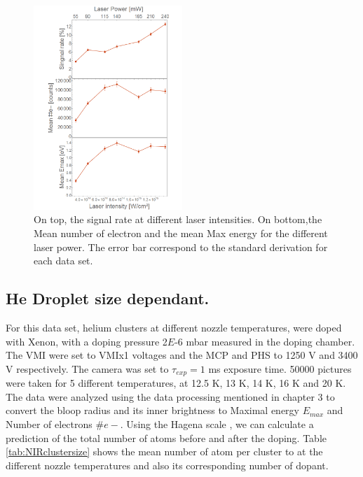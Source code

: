  \begin{figure}[h!]
\centering
\includegraphics[width=0.5\textwidth]{../Images/results/NIR_He_intensityscan/Alltogether.png} 
\caption[NIR He intensity dependence. Signal Rate and Mean Values)]{On top, the signal rate at different laser intensities. On bottom,the Mean number of electron and the mean Max energy for the different laser power. The error bar correspond to the standard derivation for each data set.}
\label{fig:NIRHEall}
\end{figure}



\subsection{He Droplet size dependant.}

 For this data set, helium clusters at different nozzle temperatures, were doped with Xenon, with a doping pressure 2$E$-6 mbar measured in the doping chamber. The VMI were set to VMIx1 voltages and the MCP and PHS to 1250 V and 3400 V respectively. The camera was set to $\tau_{exp}=1$ ms exposure time. 50000 pictures were taken for 5 different temperatures, at 12.5 K, 13 K, 14 K, 16 K and 20 K. The data were analyzed using the data processing mentioned in chapter 3 to convert the bloop radius and its inner brightness to Maximal energy $E_{max}$ and Number of electrons $\#e-$.  Using the Hagena scale \cite{hagena_cluster_1972}, we can calculate a prediction of the total number of atoms before and after the doping. Table \ref{tab:NIRclustersize} shows the  mean number of atom per cluster to at the different nozzle temperatures and also its corresponding number of dopant. 

